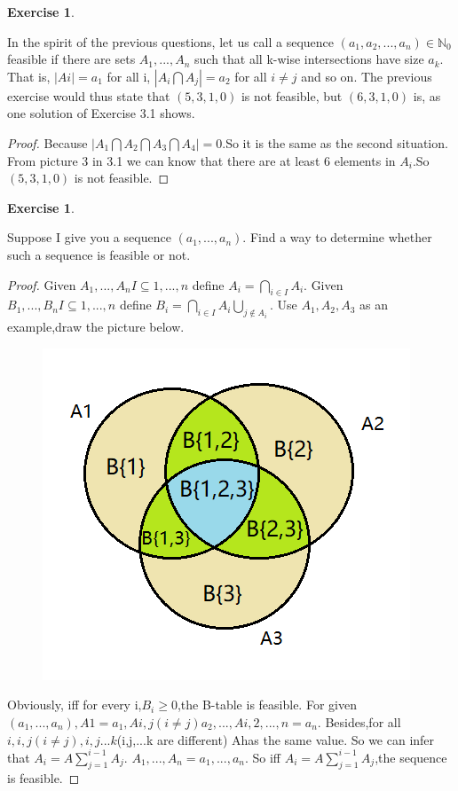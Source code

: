 \documentclass[12pt,a4]{article}
\newtheorem{exercise}[theorem]{Exercise}
\begin{document}
\begin{exercise}
\end{exercise}
	In the spirit of the previous questions, let us call a sequence $(a_1,a_2,...,a_n)\in\mathbb{N}_0$ feasible if there are sets $A_1,...,A_n$ such that all k-wise intersections have size $a_k$. That is, $|Ai| = a_{1}$ for all i, $|A_i \bigcap A_j| = a_2$ for all $i \not= j$ and so on. The previous exercise would thus state that $(5, 3, 1, 0)$ is not feasible, but $(6, 3, 1, 0)$ is, as one solution of Exercise 3.1 shows.

\begin{proof}
	Because $|A_1 \bigcap A_2 \bigcap A_3 \bigcap A_4 |=0$.So it is the same as the second situation. From picture 3 in 3.1 we can know that there are at least 6 elements in $A_i$.So $(5,3,1,0)$ is not feasible.
\end{proof}


\begin{exercise}
\end{exercise}
	Suppose I give you a sequence $(a_1,...,a_n)$. Find a way to determine whether such a sequence is feasible or not.



\begin{proof}
Given $A_1,...,A_n I\subseteq{1,...,n}$ define $A_i=\bigcap\limits_{i \in I} A_i$. Given $B_1,...,B_n I\subseteq{1,...,n}$ define $B_i=\bigcap\limits_{i \in I} A_i\bigcup \limits_{j \notin A_i}$.
Use $A_1,A_2,A_3$ as an example,draw the picture below.
 \begin{figure}[h]
	\begin{center}
		\includegraphics[width=0.32\linewidth]{Exercise3.3-1.png}
		\caption{}
		\label{Fig:4}
	\end{center}
	\vspace{-0.5em}
    \end{figure}
    Obviously, iff for every i,$B_i \geq 0$,the B-table is feasible.
    For given $(a_1,...,a_n),A{1}=a_1,A{i,j}(i\not=j)a_2,...,A{i,2,...,n}=a_n$.
    Besides,for all ${i},{i,j}(i \not=j),{i,j...k}$(i,j,...k are different) A{}has the same value.
    So we can infer that $A_i=A\sum_{j=1}^{i-1}A_j$.
    ${A_1,...,A_n}={a_1,...,a_n}$.
    So iff $A_i=A\sum_{j=1}^{i-1}A_j$,the sequence is feasible.
\end{proof}
\end{document}
